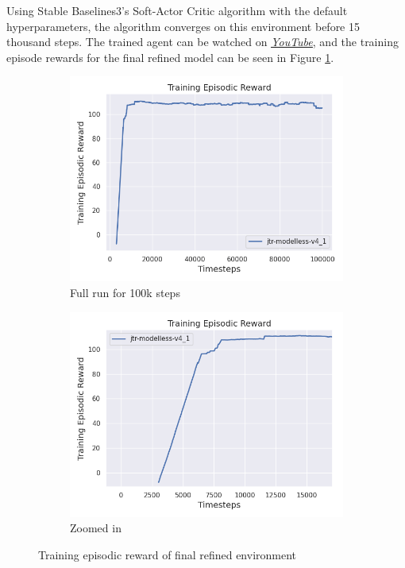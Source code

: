 \documentclass[12pt,twoside]{report}
\begin{document}
Using Stable Baselines3's Soft-Actor Critic algorithm with the default hyperparameters, the algorithm converges on this environment before 15 thousand steps. The trained agent can be watched on \href{https://youtu.be/uccN--r2uc0} {\underline{\textit{YouTube}}}, and the training episode rewards for the final refined model can be seen in Figure \ref{fig:modelless-v4}.

\begin{figure}[h]
    \centering
    \begin{subfigure}[b]{0.48\textwidth}
        \centering
        \includegraphics[width=\textwidth]{figures/rl-refinements/modelless-v4 100k steps.png}
        \caption{Full run for 100k steps}
    \end{subfigure}
    \begin{subfigure}[b]{0.48\textwidth}
        \centering
        \includegraphics[width=\textwidth]{figures/rl-refinements/modelless-v4 zoomed in.png}
        \caption{Zoomed in}
    \end{subfigure}
    \caption{Training episodic reward of final refined environment}
    \label{fig:modelless-v4}
\end{figure}
\end{document}
